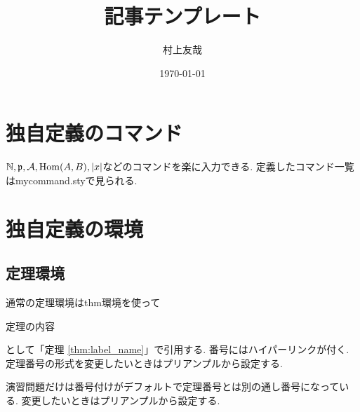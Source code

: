 \documentclass[11pt,a4paper,oneside,lualatex]{ltjsarticle} %
\begin{document}

\title{記事テンプレート}
\author{村上友哉}
\date{\today}

\maketitle

\tableofcontents


\section{独自定義のコマンド} \label{sec:command}


$ \mathbb{N}, \mathfrak{p}, \mathcal{A}, \operatorname{Hom}(A, B), \left\lvert x\right\rvert $などのコマンドを楽に入力できる.
定義したコマンド一覧は\mbox{mycommand.sty}で見られる.


\section{独自定義の環境} \label{sec:environment}



\subsection{定理環境} \label{subsec:thm}


通常の定理環境はthm環境を使って
\begin{thm}[見出し] \label{thm:label_name}
	定理の内容
\end{thm}
として「定理 \ref{thm:label_name}」で引用する.
番号にはハイパーリンクが付く.
定理番号の形式を変更したいときはプリアンプルから設定する.

\begin{exc}
	演習問題だけは番号付けがデフォルトで定理番号とは別の通し番号になっている.
	変更したいときはプリアンプルから設定する.
\end{exc}
\end{document}
